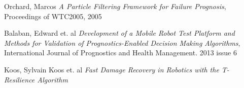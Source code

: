 \documentclass[12pt]{article}
\begin{document}
\begin{thebibliography}{9}
 Orchard, Marcos \emph{A Particle Filtering Framework
  for Failure Prognosis}, Proceedings of WTC2005, 2005

 Balaban, Edward et. al \emph{Development of a Mobile
  Robot Test Platform and Methods for Validation of
  Prognostics-Enabled Decision Making Algorithms}, International
  Journal of Prognostics and Health Management.  2013 issue 6

 Koos, Sylvain Koos et. al \emph{Fast Damage Recovery in
  Robotics with the T-Resilience Algorithm}
  
\end{thebibliography}
\end{document}

